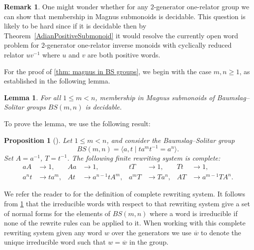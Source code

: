 \documentclass[11pt]{amsart}
\theoremstyle{plain}
\newtheorem{prop}[theorem]{Proposition}
\newtheorem{lemma}[theorem]{Lemma}
\theoremstyle{definition}
\newtheorem{remark}[theorem]{Remark}
\begin{document}
\begin{remark} 
One might wonder whether for any $2$-generator one-relator group we can show that membership in Magnus submonoids is decidable. This question is likely to be hard since if it is decidable then by Theorem~\ref{AdianPositiveSubmonoid} it would resolve the currently open word problem for $2$-generator one-relator inverse monoids with cyclically reduced relator $uv^{-1}$ where $u$ and $v$ are both positive words.  
\end{remark}


For the proof of \cref{thm: magnus in BS groups}, we begin with the case $m, n \geq 1$, as established in the following lemma.

\begin{lemma}\label{lem: magnus in positive BS groups}
For all $1 \leq m < n$, membership in Magnus submonoids of Baumslag--Solitar groups $BS(m,n)$ is decidable.
\end{lemma}

To prove the lemma, we use the following result:
\begin{prop}[{\cite[Section 2]{diekert2011computing}}]\label{diekert_rewriting_BS}
Let $1 \leq m < n$, and consider the Baumslag--Solitar group
\[
BS(m, n) = \langle a, t \mid t a^m t^{-1} = a^n \rangle.
\]
Set $A = a^{-1}$, $T = t^{-1}$.
The following finite rewriting system is complete:
\begin{align*}
a A &\to 1, & A a &\to 1, & 
t T &\to 1, & T t &\to 1, \\
a^n t &\to t a^m, & A t &\to a^{n-1} t A^m, & 
a^m T &\to T a^n, & A T &\to a^{m-1} T A^n.
\end{align*}
\end{prop}
We refer the reader to \cite[Chapter~12]{Holt2005} for the definition of complete rewriting system. 
It follows from \cref{diekert_rewriting_BS} that the irreducible words with respect to that rewriting system give a set of normal forms for the elements of $BS(m,n)$ where a word is irreducible if none of the rewrite rules can be applied to it. When working with this complete rewriting system given any word $w$ over the generators we use $\overline{w}$ to denote the unique irreducible word such that $w = \overline{w}$ in the group.      
\end{document}
